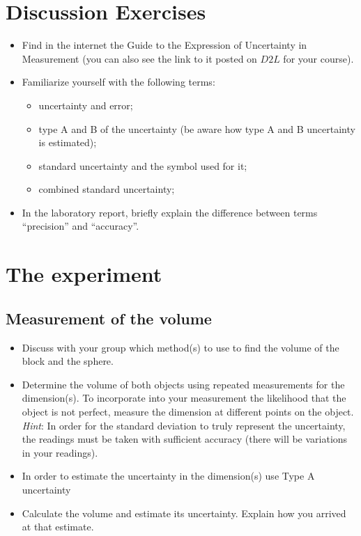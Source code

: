 \documentclass[justified]{tufte-handout}
\begin{document}
\section{Discussion Exercises}
\begin{itemize}
\item
Find in the internet the Guide to the Expression of Uncertainty in Measurement (you can also see the link to it posted on $D2L$ for your course).
\item
Familiarize yourself with the following terms: 
\begin{itemize}
\item uncertainty and error;
\item type A and B of the uncertainty (be aware how type A and B uncertainty is estimated);
\item standard uncertainty and the symbol used for it;
\item combined standard uncertainty;
\end{itemize}
\item In the laboratory report, briefly explain the difference between terms ``precision'' and ``accuracy''.
\end{itemize}


\section{The experiment}
\subsection{Measurement of the volume}
\begin{itemize}
\item
Discuss with your group which method(s) to use to find the volume of the block and the sphere.
\item
Determine the volume of both objects using repeated measurements for the dimension(s).  To incorporate into your measurement the likelihood that the object is not perfect, measure the dimension at different points on the object. \emph{Hint}: In order for the standard deviation to truly represent the uncertainty, the readings must be taken with sufficient accuracy (there will be variations in your readings).
\item
In order to estimate the uncertainty in the dimension(s) use Type A uncertainty 
\item
Calculate the volume and estimate its uncertainty. Explain how you arrived at that estimate.
\end{itemize}
\end{document}
